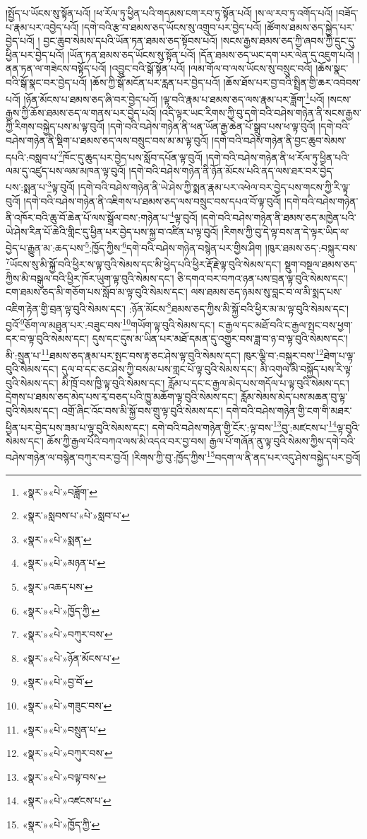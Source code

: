 །སྤྱོད་པ་ཡོངས་སུ་སྟོན་པའོ། །ཕ་རོལ་ཏུ་ཕྱིན་པའི་གདམས་ངག་རབ་ཏུ་སྟོན་པའོ། །ས་ལ་རབ་ཏུ་འགོད་པའོ། །བཟོད་པ་རྣམ་པར་འབྱེད་པའོ། །དགེ་བའི་རྩ་བ་ཐམས་ཅད་ཡོངས་སུ་འགྲུབ་པར་བྱེད་པའོ། །ཚོགས་ཐམས་ཅད་སྐྱེད་པར་བྱེད་པའོ། །
བྱང་ཆུབ་སེམས་དཔའི་ཡོན་ཏན་ཐམས་ཅད་སྟོབས་པའོ། །སངས་རྒྱས་ཐམས་ཅད་ཀྱི་ཞབས་ཀྱི་དྲུང་དུ་ཕྱིན་པར་བྱེད་པའོ། །ཡོན་ཏན་ཐམས་ཅད་ཡོངས་སུ་སྟོན་པའོ། །དོན་ཐམས་ཅད་ཡང་དག་པར་ལེན་དུ་འཇུག་པའོ། །ནན་ཏན་ལ་གཟེངས་བསྟོད་པའོ། །འབྱུང་བའི་སྒོ་སྟོན་པའོ། །ལམ་གོལ་བ་ལས་ཡོངས་སུ་བསྲུང་བའོ། །ཆོས་སྣང་བའི་སྒོ་སྣང་བར་བྱེད་པའོ། །ཆོས་ཀྱི་སྒོ་མངོན་པར་རླན་པར་བྱེད་པའོ། །ཆོས་ཐོས་པར་བྱ་བའི་སྤྲིན་གྱི་ཆར་འབེབས་པའོ། །ཉོན་མོངས་པ་ཐམས་ཅད་ཞི་བར་བྱེད་པའོ། །ལྟ་བའི་རྣམ་པ་ཐམས་ཅད་ལས་རྣམ་པར་ཟློག་\footnote{«སྣར་»«པེ་»བཟློག་}པའོ། །སངས་རྒྱས་ཀྱི་ཆོས་ཐམས་ཅད་ལ་གནས་པར་བྱེད་པའོ། །འདི་ལྟར་ཡང་རིགས་ཀྱི་བུ་དགེ་བའི་བཤེས་གཉེན་ནི་སངས་རྒྱས་ཀྱི་རིགས་བསྐྱེད་པས་མ་ལྟ་བུའོ། །དགེ་བའི་བཤེས་གཉེན་ནི་ཕན་ཡོན་རྒྱ་ཆེན་པོ་སྒྲུབ་པས་ཕ་ལྟ་བུའོ། །དགེ་བའི་བཤེས་གཉེན་ནི་སྡིག་པ་ཐམས་ཅད་ལས་བསྲུང་བས་མ་མ་ལྟ་བུའོ། །དགེ་བའི་བཤེས་གཉེན་ནི་བྱང་ཆུབ་སེམས་དཔའི་:བསླབ་པ་\footnote{«སྣར་»སླབས་པ་«པེ་»སླབ་པ་}ཁོང་དུ་ཆུད་པར་བྱེད་པས་སློབ་དཔོན་ལྟ་བུའོ། །དགེ་བའི་བཤེས་གཉེན་ནི་ཕ་རོལ་ཏུ་ཕྱིན་པའི་ལམ་དུ་འཛུད་པས་ལམ་མཁན་ལྟ་བུའོ། །དགེ་བའི་བཤེས་གཉེན་ནི་ཉོན་མོངས་པའི་ནད་ལས་ཐར་བར་བྱེད་པས་:སྨན་པ་\footnote{«སྣར་»«པེ་»སྨན་}ལྟ་བུའོ། །དགེ་བའི་བཤེས་གཉེན་ནི་ཡེ་ཤེས་ཀྱི་སྨན་རྣམ་པར་འཕེལ་བར་བྱེད་པས་གངས་ཀྱི་རི་ལྟ་བུའོ། །དགེ་བའི་བཤེས་གཉེན་ནི་འཇིགས་པ་ཐམས་ཅད་ལས་བསྲུང་བས་དཔའ་བོ་ལྟ་བུའོ། །དགེ་བའི་བཤེས་གཉེན་ནི་འཁོར་བའི་ཆུ་བོ་ཆེན་པོ་ལས་སྒྲོལ་བས་:གཉེན་པ་\footnote{«སྣར་»«པེ་»མཉན་པ་}ལྟ་བུའོ། །དགེ་བའི་བཤེས་གཉེན་ནི་ཐམས་ཅད་མཁྱེན་པའི་ཡེ་ཤེས་རིན་པོ་ཆེའི་གླིང་དུ་ཕྱིན་པར་བྱེད་པས་སྐྱ་བ་འཛིན་པ་ལྟ་བུའོ། །རིགས་ཀྱི་བུ་དེ་ལྟ་བས་ན་དེ་ལྟར་ཡིད་ལ་བྱེད་པ་རྒྱུན་མ་:ཆད་པས་\footnote{«སྣར་»འཆད་པས་}:ཁྱོད་ཀྱིས་\footnote{«སྣར་»«པེ་»ཁྱོད་ཀྱི་}དགེ་བའི་བཤེས་གཉེན་བསྙེན་པར་གྱིས་ཤིག །ཁུར་ཐམས་ཅད་:བསྐུར་བས་\footnote{«སྣར་»«པེ་»བཀུར་བས་}ཡོངས་སུ་མི་སྐྱོ་བའི་ཕྱིར་ས་ལྟ་བུའི་སེམས་དང་མི་ཕྱེད་པའི་ཕྱིར་རྡོ་རྗེ་ལྟ་བུའི་སེམས་དང་། སྡུག་བསྔལ་ཐམས་ཅད་ཀྱིས་མི་བསྒུལ་བའི་ཕྱིར་ཁོར་ཡུག་ལྟ་བུའི་སེམས་དང་། ཅི་དགའ་བར་བཀའ་ཉན་པས་བྲན་ལྟ་བུའི་སེམས་དང་། ངག་ཐམས་ཅད་མི་གཅོག་པས་སློབ་མ་ལྟ་བུའི་སེམས་དང་། ལས་ཐམས་ཅད་ཉམས་སུ་བླང་བ་ལ་མི་སྨད་པས་འཇིག་རྟེན་གྱི་བྲན་ལྟ་བུའི་སེམས་དང་། :ཉོན་མོངས་\footnote{«སྣར་»«པེ་»ཉོན་མོངས་པ་}ཐམས་ཅད་ཀྱིས་མི་སྐྱོ་བའི་ཕྱིར་མ་མ་ལྟ་བུའི་སེམས་དང་། བྱའོ་\footnote{«སྣར་»«པེ་»བྱ་བོ་}ཅོག་ལ་མཐུན་པར་:བཟུང་བས་\footnote{«སྣར་»«པེ་»གཟུང་བས་}གཡོག་ལྟ་བུའི་སེམས་དང་། ང་རྒྱལ་དང་མཐོ་བའི་ང་རྒྱལ་སྤང་བས་ཕྱག་དར་བ་ལྟ་བུའི་སེམས་དང་། དུས་དང་དུས་མ་ཡིན་པར་མཐོ་དམན་དུ་འགྱུར་བས་ཟླ་བ་ཉ་བ་ལྟ་བུའི་སེམས་དང་། མི་:སྲུན་པ་\footnote{«སྣར་»«པེ་»བསྲུན་པ་}ཐམས་ཅད་རྣམ་པར་སྤང་བས་རྟ་ཅང་ཤེས་ལྟ་བུའི་སེམས་དང་། ཁུར་ལྕི་བ་:བསྐུར་བས་\footnote{«སྣར་»«པེ་»བཀུར་བས་}ཐེག་པ་ལྟ་བུའི་སེམས་དང་། དུལ་བ་དང་ཅང་ཤེས་ཀྱི་བསམ་པས་གླང་པོ་ལྟ་བུའི་སེམས་དང་། མི་འགུལ་མི་བསྐྱོད་པས་རི་ལྟ་བུའི་སེམས་དང་། མི་ཁྲོ་བས་ཁྱི་ལྟ་བུའི་སེམས་དང་། རློམ་པ་དང་ང་རྒྱལ་མེད་པས་གདོལ་པ་ལྟ་བུའི་སེམས་དང་། དྲེགས་པ་ཐམས་ཅད་མེད་པས་རྭ་བཅད་པའི་ཁྱུ་མཆོག་ལྟ་བུའི་སེམས་དང་། རློམ་སེམས་མེད་པས་མཆན་བུ་ལྟ་བུའི་སེམས་དང་། འགྲོ་ཞིང་འོང་བས་མི་སྐྱོ་བས་གྲུ་ལྟ་བུའི་སེམས་དང་། དགེ་བའི་བཤེས་གཉེན་གྱི་ངག་གི་མཐར་ཕྱིན་པར་བྱེད་པས་ཟམ་པ་ལྟ་བུའི་སེམས་དང་། དགེ་བའི་བཤེས་གཉེན་གྱི་ངོར་:ལྟ་བས་\footnote{«སྣར་»«པེ་»བལྟ་བས་}བུ་:མཛངས་པ་\footnote{«སྣར་»«པེ་»འཛངས་པ་}ལྟ་བུའི་སེམས་དང་། ཆོས་ཀྱི་རྒྱལ་པོའི་བཀའ་ལས་མི་འདའ་བར་བྱ་བས། རྒྱལ་པོ་གཞོན་ནུ་ལྟ་བུའི་སེམས་ཀྱིས་དགེ་བའི་བཤེས་གཉེན་ལ་བསྙེན་བཀུར་བར་བྱའོ། །རིགས་ཀྱི་བུ་:ཁྱོད་ཀྱིས་\footnote{«སྣར་»«པེ་»ཁྱོད་ཀྱི་}བདག་ལ་ནི་ནད་པར་འདུ་ཤེས་བསྐྱེད་པར་བྱའོ། 